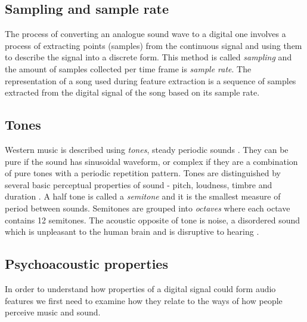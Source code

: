 \subsection{Sampling and sample rate}
\label{subsec:sampling}
The process of converting an analogue sound wave to a digital one involves a
process of extracting points (samples) from the continuous signal and using them
to describe the signal into a discrete form. This method is called
\textit{sampling} and the amount of samples collected per time frame is
\textit{sample rate}. The representation of a song used during feature
extraction is a sequence of samples extracted from the digital signal of the
song based on its sample rate.

\subsection{Tones}
\label{subsec:tones}
Western music is described using \textit{tones}, steady periodic sounds
\cite{wiki:tone}. They can be pure if the sound has sinusoidal waveform, or
complex if they are a combination of pure tones with a periodic repetition
pattern. Tones are distinguished by several basic perceptual properties of sound
- pitch, loudness, timbre and duration \cite{acoustic-glossary-power}. A half
tone is called a \textit{semitone} and it is the smallest measure of period
between sounds. Semitones are grouped into \textit{octaves} where each octave
contains 12 semitones. The acoustic opposite of tone is noise, a disordered
sound which is unpleasant to the human brain and is disruptive to hearing
\cite{music-noise}. 

\subsection{Psychoacoustic properties}
\label{subsec:psychoacoustic}
In order to understand how properties of a digital signal could form audio
features we first need to examine how they relate to the ways of how people
perceive music and sound. 

